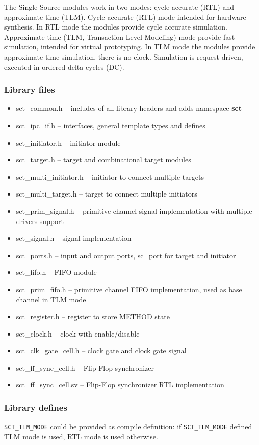The Single Source modules work in two modes: cycle accurate (RTL) and approximate time (TLM). Cycle accurate (RTL) mode intended for hardware synthesis. In RTL mode the modules provide cycle accurate simulation. Approximate time (TLM, Transaction Level Modeling) mode provide fast simulation, intended for virtual prototyping. In TLM mode the modules provide approximate time simulation, there is no clock. Simulation is request-driven, executed in ordered delta-cycles (DC).

\subsubsection{Library files}

\begin{itemize}
\item sct\_common.h -- includes of all library headers and adds namespace \textbf{sct}
\item sct\_ipc\_if.h -- interfaces, general template types and defines
\item sct\_initiator.h -- initiator module
\item sct\_target.h -- target and combinational target modules
\item sct\_multi\_initiator.h -- initiator to connect multiple targets
\item sct\_multi\_target.h -- target to connect multiple initiators
\item sct\_prim\_signal.h -- primitive channel signal implementation with multiple drivers support
\item sct\_signal.h -- signal implementation
\item sct\_ports.h -- input and output ports, sc\_port for target and initiator
\item sct\_fifo.h -- FIFO module
\item sct\_prim\_fifo.h -- primitive channel FIFO implementation, used as base channel in TLM mode
\item sct\_register.h -- register to store METHOD state
\item sct\_clock.h -- clock with enable/disable
\item sct\_clk\_gate\_cell.h -- clock gate and clock gate signal
\item sct\_ff\_sync\_cell.h -- Flip-Flop synchronizer
\item sct\_ff\_sync\_cell.sv -- Flip-Flop synchronizer RTL implementation
\end{itemize}

\subsubsection{Library defines}
{\tt SCT\_TLM\_MODE} could be provided as compile definition: if {\tt SCT\_TLM\_MODE} defined TLM mode is used, RTL mode is used otherwise.

